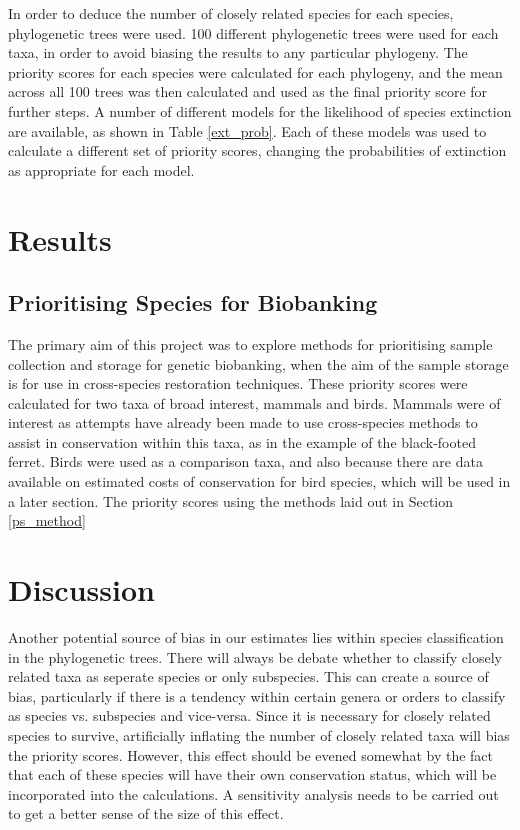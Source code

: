 \documentclass[10pt]{article}
\begin{document}
	In order to deduce the number of closely related species for each species, phylogenetic trees were used. 100 different phylogenetic trees were used for each taxa, in order to avoid biasing the results to any particular phylogeny. The priority scores for each species were calculated for each phylogeny, and the mean across all 100 trees was then calculated and used as the final
	priority score for further steps. A number of different models for the likelihood of species
	extinction are available, as shown in Table \ref{ext_prob}. Each of these models was used to
	calculate a different set of priority scores, changing the probabilities of extinction as
	appropriate for each model.
	
	\section{Results}
	\subsection{Prioritising Species for Biobanking}
	The primary aim of this project was to explore methods for prioritising sample collection and
	storage for genetic biobanking, when the aim of the sample storage is for use in cross-species
	restoration techniques. These priority scores were calculated for two taxa of broad interest,
	mammals and birds. Mammals were of interest as attempts have already been made to use
	cross-species methods to assist in conservation within this taxa, as in the example of the
	black-footed ferret. Birds were used as a comparison taxa, and also because there are data
	available on estimated costs of conservation for bird species, which will be used in a later section. The priority scores using the methods laid out in Section \ref{ps_method}
	
	\section{Discussion}
	Another potential source of bias in our estimates lies within species
	classification in the phylogenetic trees. There will always be debate whether
	to classify closely related taxa as seperate species or only subspecies. This
	can create a source of bias, particularly if there is a tendency within certain
	genera or orders to classify as species vs. subspecies and vice-versa. Since it
	is necessary for closely related species to survive, artificially inflating the
	number of closely related taxa will bias the priority scores. However, this
	effect should be evened somewhat by the fact that each of these species will 
	have their own conservation status, which will be incorporated into the
	calculations. A sensitivity analysis needs to be carried out to get a better
	sense of the size of this effect.
	
\end{document}
